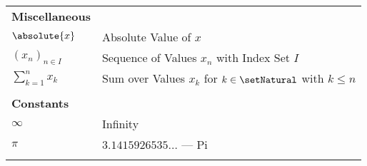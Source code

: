 \documentclass[crop=false,10pt,ngerman]{standalone}
\begin{document}
{\begin{tabularx}{\textwidth}{p{}p{}}
      \\
      \hline
      \textbf{Miscellaneous} & \\
      $\absolute{x}$ & Absolute Value of $x$ \\
      $(x_n)_{n\in I}$ & Sequence of Values $x_n$ with Index Set $I$ \\
      $\sum_{k=1}^n x_k$ & Sum over Values $x_k$ for $k\in\setNatural$ with $k\leq n$ \\

      \\
      \hline
      \textbf{Constants} & \\
      $\infty$ & Infinity \\
      $π$ & $3.1415926535\ldots$ --- Pi \\


      \\
      \hline
    \end{tabularx}
  }
\end{document}
